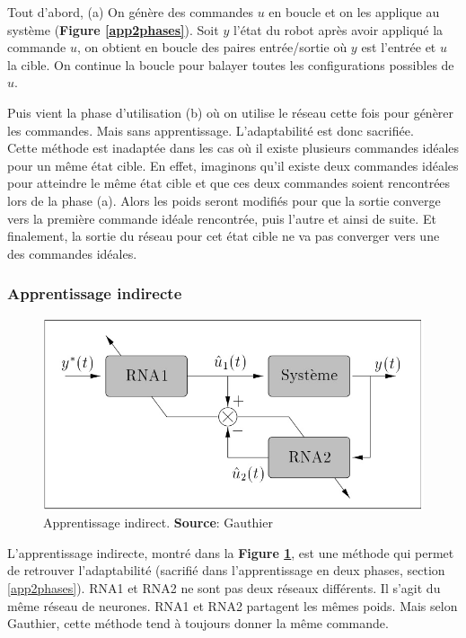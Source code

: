 Tout d'abord, (a) On génère des commandes $u$ en boucle et on les applique au système (\textbf{Figure \ref{app2phases}}).
Soit $y$ l'état du robot après avoir appliqué la commande $u$, on obtient en boucle des paires entrée/sortie où $y$ est l'entrée et $u$ la cible.
On continue la boucle pour balayer toutes les configurations possibles de $u$.

Puis vient la phase d'utilisation (b) où on utilise le réseau cette fois pour génèrer les commandes. Mais sans apprentissage. L'adaptabilité est donc sacrifiée.\\

Cette méthode est inadaptée dans les cas où il existe plusieurs commandes idéales pour un même état cible.
En effet, imaginons qu'il existe deux commandes idéales pour atteindre le même état cible et que ces deux commandes soient rencontrées lors de la phase (a).
Alors les poids seront modifiés pour que la sortie converge vers la première commande idéale rencontrée, puis l'autre et ainsi de suite.
Et finalement, la sortie du réseau pour cet état cible ne va pas converger vers une des commandes idéales.

\subsubsection{Apprentissage indirecte}\label{sec:appindirect}
\begin{figure}
 \centering
 \includegraphics[scale=0.5]{../figures/appindirect.jpg}
 \caption{Apprentissage indirect. \textbf{Source}: Gauthier\cite{Gauthier}}
 \label{appindirect}
\end{figure}
L'apprentissage indirecte, montré dans la \textbf{Figure \ref{appindirect}}, est une méthode qui permet de retrouver l'adaptabilité (sacrifié dans l'apprentissage en deux phases, section \ref{app2phases}).
RNA1 et RNA2 ne sont pas deux réseaux différents. Il s'agit du même réseau de neurones.
RNA1 et RNA2 partagent les mêmes poids.
Mais selon Gauthier\cite{Gauthier}, cette méthode tend à toujours donner la même commande.

